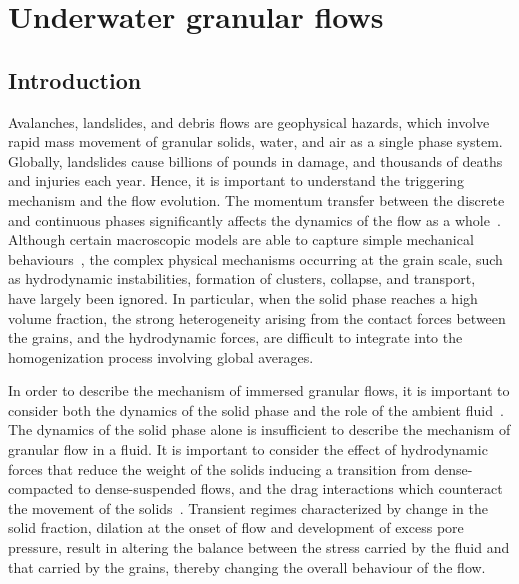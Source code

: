 \chapter{Underwater granular flows}

\ifpdf
    \graphicspath{{Chapter6/figs/raster/}{Chapter6/figs/pdf/}{Chapter6/figs/}}
\else
    \graphicspath{{Chapter6/figs/vector/}{Chapter6/figs/}}
\fi

\section{Introduction}

Avalanches, landslides, and debris flows are geophysical hazards, which involve 
rapid mass movement of granular solids, water, and air as a single phase 
system. Globally, landslides 
cause billions of pounds in damage, and thousands of deaths and injuries each 
year. Hence, it is important to understand the triggering mechanism and the flow
evolution. The momentum transfer between the discrete and continuous 
phases significantly affects the dynamics of the flow as a 
whole~\citep{Topin2012}. Although certain macroscopic models are able to 
capture simple mechanical 
behaviours~\citep{Peker2007}, the complex physical mechanisms occurring at the 
grain scale, such as hydrodynamic instabilities, formation of clusters, 
collapse, and transport,~\citep{Topin2011} have largely been ignored. In 
particular, when the solid phase reaches a high volume fraction, the strong 
heterogeneity arising from the contact forces between the grains, and the 
hydrodynamic forces, are difficult to integrate into the homogenization process 
involving global averages. 

In order to describe the mechanism of immersed 
granular flows, it is important to consider both the dynamics of the solid 
phase and the role of the ambient fluid~\citep{Denlinger2001}. The dynamics of 
the solid phase alone is insufficient to describe the mechanism of granular 
flow in a fluid. It is important to consider the effect of hydrodynamic forces 
that reduce the weight of the solids inducing a transition from dense-compacted 
to dense-suspended flows, and the drag interactions which counteract the 
movement of the solids~\citep{Meruane2010}. Transient regimes characterized by 
change in the solid fraction, dilation at the onset of flow and development of 
excess pore pressure, result in altering the balance between the stress carried 
by the fluid and that carried by the grains, thereby changing the overall 
behaviour of the flow. 


